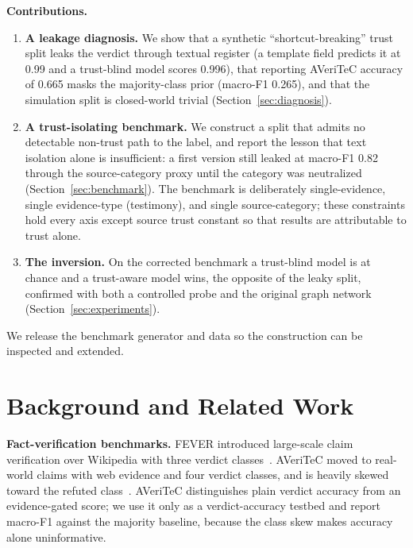 \documentclass[conference]{IEEEtran}
\begin{document}
\textbf{Contributions.}
\begin{enumerate}
\item \textbf{A leakage diagnosis.} We show that a synthetic ``shortcut-breaking'' trust split leaks the verdict through textual register (a template field predicts it at 0.99 and a trust-blind model scores 0.996), that reporting AVeriTeC accuracy of 0.665 masks the majority-class prior (macro-F1 0.265), and that the simulation split is closed-world trivial (Section~\ref{sec:diagnosis}).
\item \textbf{A trust-isolating benchmark.} We construct a split that admits no detectable non-trust path to the label, and report the lesson that text isolation alone is insufficient: a first version still leaked at macro-F1 0.82 through the source-category proxy until the category was neutralized (Section~\ref{sec:benchmark}). The benchmark is deliberately single-evidence, single evidence-type (testimony), and single source-category; these constraints hold every axis except source trust constant so that results are attributable to trust alone.
\item \textbf{The inversion.} On the corrected benchmark a trust-blind model is at chance and a trust-aware model wins, the opposite of the leaky split, confirmed with both a controlled probe and the original graph network (Section~\ref{sec:experiments}).
\end{enumerate}
We release the benchmark generator and data so the construction can be inspected and extended.

\section{Background and Related Work}
\textbf{Fact-verification benchmarks.} FEVER introduced large-scale claim verification over Wikipedia with three verdict classes~\cite{thorne2018fever}. AVeriTeC moved to real-world claims with web evidence and four verdict classes, and is heavily skewed toward the refuted class~\cite{schlichtkrull2023averitec}. AVeriTeC distinguishes plain verdict accuracy from an evidence-gated score; we use it only as a verdict-accuracy testbed and report macro-F1 against the majority baseline, because the class skew makes accuracy alone uninformative.
\end{document}
